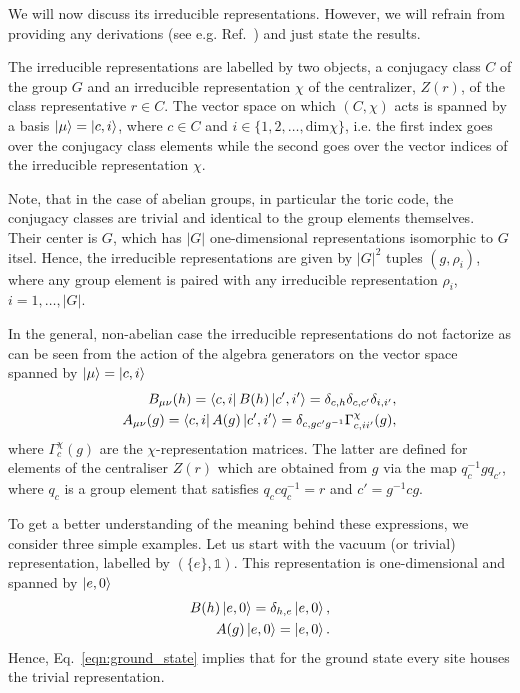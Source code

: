 \documentclass[two column]{article}
\begin{document}
We will now discuss its irreducible representations. However, we will refrain from providing any derivations (see e.g. Ref.~\cite{Cui_2015}) and just state the results. 

The irreducible representations are labelled by two objects, a conjugacy class $C$ of the group $G$ and an irreducible representation $\chi$ of the centralizer, $Z(r)$, of the class representative $r \in C$. The vector space on which $(C, \chi)$ acts is spanned by a basis $\ket{\mu} = \ket{c, i}$, where $c \in C$ and $i \in \{1, 2, \ldots, \text{dim}\chi\}$, i.e. the first index goes over the conjugacy class elements while the second goes over the vector indices of the irreducible representation $\chi$.

Note, that in the case of abelian groups, in particular the toric code, the conjugacy classes are trivial and identical to the group elements themselves. Their center is $G$, which has $|G|$ one-dimensional representations isomorphic to $G$ itsel. Hence, the irreducible representations are given by $|G|^2$ tuples $(g,\rho_i)$, where any group element is paired with any irreducible representation $\rho_i$, $i=1,\ldots, |G|$.

In the general, non-abelian case the irreducible representations do not factorize as can be seen from the action of the algebra generators on the vector space spanned by $\ket{\mu}=\ket{c,i}$ %
\begin{equation}
    \begin{split}
        B_{\mu\nu}{(h)}=\bra{c, i} B{(h)} \ket{c', i'} = \delta_{c, h} \delta_{c, c'}\delta_{i, i'}, \\
        A_{\mu\nu}{(g)}= \bra{c, i} A{(g)} \ket{c', i'} = \delta_{c,gc'g^{-1}} \Gamma^\chi_{c,ii'}(g),
    \end{split}
\end{equation}
where $\Gamma^\chi_c(g)$ are the $\chi$-representation matrices. The latter are defined for elements of the centraliser $Z(r)$ which are obtained from $g$ via the map $q_{c}^{-1}gq_{c'}$, where $q_c$ is a group element that satisfies $q_c c q_c^{-1} = r$ and $c'=g^{-1}cg$. 


To get a better understanding of the meaning behind these expressions, we consider three simple examples. Let us start with the vacuum (or trivial) representation, labelled by $(\{e\}, \mathbb{1})$. This representation is one-dimensional and spanned by $\ket{e, 0}$
\begin{equation}
    \begin{split}
        B{(h)}\ket{e, 0} = \delta_{h,e}\ket{e, 0},\\
        A{(g)}\ket{e, 0} = \ket{e,0}.
    \end{split}
\end{equation}
Hence, Eq.~\eqref{eqn:ground_state} implies that for the ground state every site houses the trivial representation.
\end{document}
